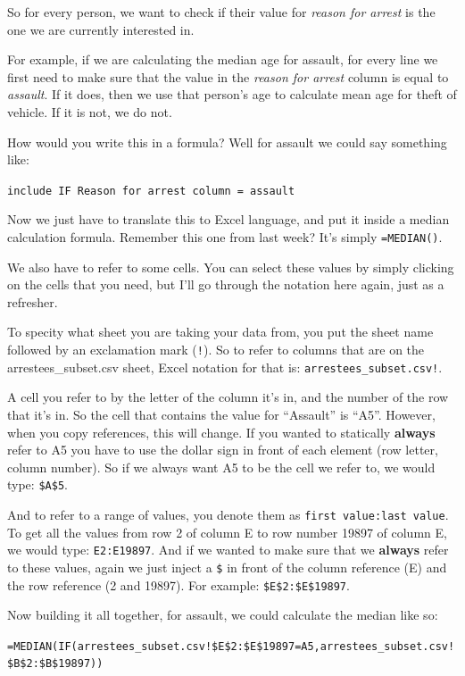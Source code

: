 \documentclass[
]{book}
\begin{document}
So for every person, we want to check if their value for \emph{reason for arrest} is the one we are currently interested in.

For example, if we are calculating the median age for assault, for every line we first need to make sure that the value in the \emph{reason for arrest} column is equal to \emph{assault}. If it does, then we use that person's age to calculate mean age for theft of vehicle. If it is not, we do not.

How would you write this in a formula? Well for assault we could say something like:

\texttt{include\ IF\ \textquotesingle{}Reason\ for\ arrest\ column\textquotesingle{}\ =\ \textquotesingle{}assault\textquotesingle{}}

Now we just have to translate this to Excel language, and put it inside a median calculation formula. Remember this one from last week? It's simply \texttt{=MEDIAN()}.

We also have to refer to some cells. You can select these values by simply clicking on the cells that you need, but I'll go through the notation here again, just as a refresher.

To specity what sheet you are taking your data from, you put the sheet name followed by an exclamation mark (\texttt{!}). So to refer to columns that are on the arrestees\_subset.csv sheet, Excel notation for that is: \texttt{arrestees\_subset.csv!}.

A cell you refer to by the letter of the column it's in, and the number of the row that it's in. So the cell that contains the value for ``Assault'' is ``A5''. However, when you copy references, this will change. If you wanted to statically \textbf{always} refer to A5 you have to use the dollar sign in front of each element (row letter, column number). So if we always want A5 to be the cell we refer to, we would type: \texttt{\$A\$5}.

And to refer to a range of values, you denote them as \texttt{first\ value:last\ value}. To get all the values from row 2 of column E to row number 19897 of column E, we would type: \texttt{E2:E19897}. And if we wanted to make sure that we \textbf{always} refer to these values, again we just inject a \texttt{\$} in front of the column reference (E) and the row reference (2 and 19897). For example: \texttt{\$E\$2:\$E\$19897}.

Now building it all together, for assault, we could calculate the median like so:

\texttt{=MEDIAN(IF(arrestees\_subset.csv!\$E\$2:\$E\$19897=A5,arrestees\_subset.csv!\$B\$2:\$B\$19897))}
\end{document}
